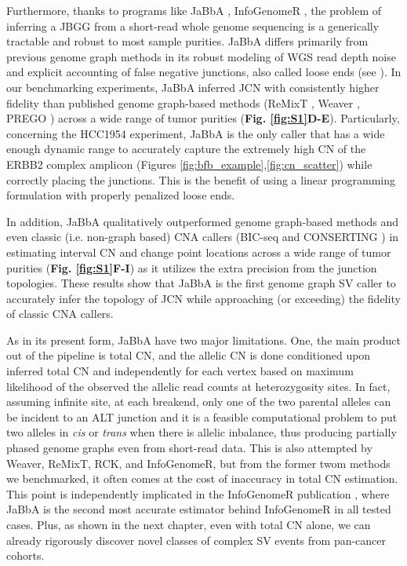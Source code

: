 \documentclass[phd,tocprelim]{cornell}
\begin{document}
Furthermore, thanks to programs like JaBbA \cite{Hadi2020-um}, InfoGenomeR \cite{Lee2021-rl}, the problem of inferring a JBGG from a short-read whole genome sequencing is a generically tractable and robust to most sample purities. JaBbA differs primarily from previous genome graph methods in its robust modeling of WGS read depth noise and explicit accounting of false negative junctions, also called loose ends (see ). In our benchmarking experiments, JaBbA inferred JCN with consistently higher fidelity than published genome graph-based methods (ReMixT \cite{McPherson2017-ry}, Weaver \cite{Li2016-qa}, PREGO \cite{Oesper2012-vw}) across a wide range of tumor purities (\textbf{Fig. \ref{fig:S1}D-E}). Particularly, concerning the HCC1954 experiment, JaBbA is the only caller that has a wide enough dynamic range to accurately capture the extremely high CN of the ERBB2 complex amplicon (Figures \ref{fig:bfb_example},\ref{fig:cn_scatter}) while correctly placing the junctions. This is the benefit of using a linear programming formulation with properly penalized loose ends.

In addition, JaBbA qualitatively outperformed genome graph-based methods and even classic (i.e. non-graph based) CNA callers (BIC-seq \cite{Xi2011-oa} and CONSERTING \cite{Chen2015-sw}) in estimating interval CN and change point locations across a wide range of tumor purities (\textbf{Fig. \ref{fig:S1}F-I}) as it utilizes the extra precision from the junction topologies. These results show that JaBbA is the first genome graph SV caller to accurately infer the topology of JCN while approaching (or exceeding) the fidelity of classic CNA callers.

As in its present form, JaBbA have two major limitations. One, the main product out of the pipeline is total CN, and the allelic CN is done conditioned upon inferred total CN and independently for each vertex based on maximum likelihood of the observed the allelic read counts at heterozygosity sites. In fact, assuming infinite site, at each breakend, only one of the two parental alleles can be incident to an ALT junction and it is a feasible computational problem to put two alleles in \textit{cis} or \textit{trans} when there is allelic inbalance, thus producing partially phased genome graphs even from short-read data. This is also attempted by Weaver, ReMixT, RCK, and InfoGenomeR, but from the former twom methods we benchmarked, it often comes at the cost of inaccuracy in total CN estimation. This point is independently implicated in the InfoGenomeR publication \cite{Lee2021-rl}, where JaBbA is the second most accurate estimator behind InfoGenomeR in all tested cases. Plus, as shown in the next chapter, even with total CN alone, we can already rigorously discover novel classes of complex SV events from pan-cancer cohorts.
\end{document}

